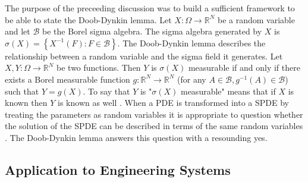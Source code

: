 The purpose of the preceeding discussion was to build a sufficient framework to be able to state the Doob-Dynkin lemma. Let $X:\Omega \rightarrow \mathbb{R}^N$ be a random variable and let $\mathcal{B}$ be the Borel sigma algebra. The sigma algebra generated by $X$ is $\sigma\left(X\right)=\left\{X^{-1}\left(F\right):F\in\mathcal{B}\right\}$. The Doob-Dynkin lemma describes the relationship between a random variable and the sigma field it generates. Let $X,Y:\Omega \rightarrow \mathbb{R}^N$ be two functions. Then $Y$ is $\sigma\left(X\right)$ measurable if and only if there exists a Borel measurable function $g:\mathbb{R}^N \rightarrow \mathbb{R}^N$ (for any $A\in \mathcal{B},g^{-1}\left(A\right)\in\mathcal{B}$) such that $Y=g(X)$. To say that $Y$ is "$\sigma\left(X\right)$ measurable" means that if $X$ is known then  $Y$ is known as well \cite{PrbThryPrlms}. When a \ac{PDE} is transformed into a \ac{SPDE} by treating the parameters as random variables it is appropriate to question whether the solution of the \ac{SPDE} can be described in terms of the same random variables \cite{AHSGC}. The Doob-Dynkin lemma answers this question with a resounding yes.
          
\subsection{Application to Engineering Systems} \label{subsec:spde_apps2engineering} 
 
